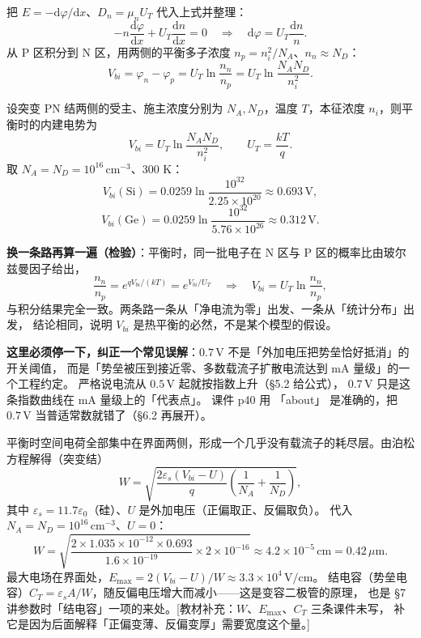 \documentclass[11pt]{ctexart}
\begin{document}
把 $E=-\mathrm{d}\varphi/\mathrm{d}x$、$D_n=\mu_nU_T$ 代入上式并整理：
\[
-n\frac{\mathrm{d}\varphi}{\mathrm{d}x}+U_T\frac{\mathrm{d}n}{\mathrm{d}x}=0
\quad\Longrightarrow\quad
\mathrm{d}\varphi=U_T\frac{\mathrm{d}n}{n}.
\]
从 P 区积分到 N 区，用两侧的平衡多子浓度 $n_p=n_i^2/N_A$、$n_n\approx N_D$：
\[
V_{bi}=\varphi_n-\varphi_p
=U_T\ln\frac{n_n}{n_p}
=U_T\ln\frac{N_A N_D}{n_i^2}.
\]
\begin{center}
\begin{minipage}{0.94\linewidth}
设突变 PN 结两侧的受主、施主浓度分别为 $N_A,N_D$，温度 $T$，本征浓度 $n_i$，则平衡时的内建电势为
\[
V_{bi}=U_T\ln\frac{N_A N_D}{n_i^2},\qquad U_T=\frac{kT}{q}.
\]
取 $N_A=N_D=10^{16}\,\mathrm{cm^{-3}}$、300 K：
\[
V_{bi}(\mathrm{Si})=0.0259\ln\frac{10^{32}}{2.25\times10^{20}}\approx0.693\,\mathrm{V},
\]
\[
V_{bi}(\mathrm{Ge})=0.0259\ln\frac{10^{32}}{5.76\times10^{26}}\approx0.312\,\mathrm{V}.
\]
\end{minipage}
\end{center}

\textbf{换一条路再算一遍（检验）}：平衡时，同一批电子在 N 区与 P 区的概率比由玻尔兹曼因子给出，
\[
\frac{n_n}{n_p}=e^{qV_{bi}/(kT)}=e^{V_{bi}/U_T}
\quad\Longrightarrow\quad
V_{bi}=U_T\ln\frac{n_n}{n_p},
\]
与积分结果完全一致。两条路一条从「净电流为零」出发、一条从「统计分布」出发，
结论相同，说明 $V_{bi}$ 是热平衡的必然，不是某个模型的假设。

\textbf{这里必须停一下，纠正一个常见误解}：$0.7\,\mathrm{V}$ 不是「外加电压把势垒恰好抵消」的开关阈值，
而是「势垒被压到接近零、多数载流子扩散电流达到 mA 量级」的一个工程约定。
严格说电流从 $0.5\,\mathrm{V}$ 起就按指数上升（§5.2 给公式），
$0.7\,\mathrm{V}$ 只是这条指数曲线在 mA 量级上的「代表点」。
课件 p40 用 「about」 是准确的，把 $0.7\,\mathrm{V}$ 当普适常数就错了（§6.2 再展开）。


平衡时空间电荷全部集中在界面两侧，形成一个几乎没有载流子的耗尽层。由泊松方程解得（突变结）
\[
W=\sqrt{\frac{2\varepsilon_s\left(V_{bi}-U\right)}{q}\left(\frac{1}{N_A}+\frac{1}{N_D}\right)},
\]
其中 $\varepsilon_s=11.7\varepsilon_0$（硅）、$U$ 是外加电压（正偏取正、反偏取负）。
代入 $N_A=N_D=10^{16}\,\mathrm{cm^{-3}}$、$U=0$：
\[
W=\sqrt{\frac{2\times1.035\times10^{-12}\times0.693}{1.6\times10^{-19}}\times2\times10^{-16}}
\approx4.2\times10^{-5}\,\mathrm{cm}=0.42\,\mu\mathrm{m}.
\]
最大电场在界面处，$E_{\max}=2(V_{bi}-U)/W\approx3.3\times10^{4}\,\mathrm{V/cm}$。
结电容（势垒电容）$C_T=\varepsilon_s A/W$，随反偏电压增大而减小——这是变容二极管的原理，
也是 §7 讲参数时「结电容」一项的来处。[教材补充：$W$、$E_{\max}$、$C_T$ 三条课件未写，
补它是因为后面解释「正偏变薄、反偏变厚」需要宽度这个量。]
\end{document}
